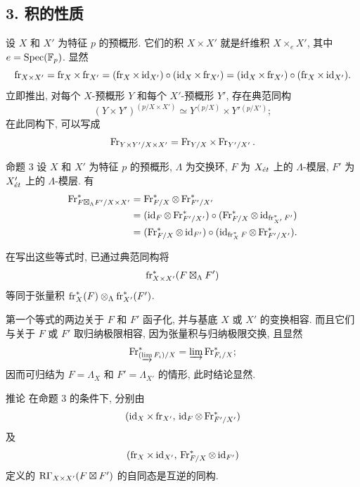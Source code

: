 \subsection*{3. 积的性质}

设 $X$ 和 $X'$ 为特征 $p$ 的预概形. 它们的积 $X\times X'$ 就是纤维积 $X\times_eX'$, 其中 $e=\operatorname{Spec}(\mathbb F_p)$. 显然
\[
\operatorname{fr}_{X\times X'}=\operatorname{fr}_X\times\operatorname{fr}_{X'}=(\operatorname{fr}_X\times\operatorname{id}_{X'})\circ(\operatorname{id}_X\times\operatorname{fr}_{X'})
=(\operatorname{id}_X\times\operatorname{fr}_{X'})\circ(\operatorname{fr}_X\times\operatorname{id}_{X'}).
\]
立即推出, 对每个 $X$-预概形 $Y$ 和每个 $X'$-预概形 $Y'$, 存在典范同构
\[
(Y\times Y')^{(p/X\times X')}
\simeq Y^{(p/X)}\times Y'{}^{(p/X')};
\]
在此同构下, 可以写成
\[
\operatorname{Fr}_{Y\times Y'/X\times X'}=\operatorname{Fr}_{Y/X}\times\operatorname{Fr}_{Y'/X'}.
\]

\begin{statement}{命题 3}
设 $X$ 和 $X'$ 为特征 $p$ 的预概形, $\Lambda$ 为交换环, $F$ 为 $X_{\acute{e}t}$ 上的 $\Lambda$-模层, $F'$ 为 $X'_{\acute{e}t}$ 上的 $\Lambda$-模层. 有
\[
\begin{aligned}
\operatorname{Fr}^*_{F\boxtimes_\Lambda F'/X\times X'}
&=\operatorname{Fr}^*_{F/X}\otimes\operatorname{Fr}^*_{F'/X'}\\
&=(\operatorname{id}_F\otimes\operatorname{Fr}^*_{F'/X'})
  \circ(\operatorname{Fr}^*_{F/X}\otimes\operatorname{id}_{\operatorname{fr}_{X'}^*F'})\\
&=(\operatorname{Fr}^*_{F/X}\otimes\operatorname{id}_{F'})
  \circ(\operatorname{id}_{\operatorname{fr}_X^*F}\otimes\operatorname{Fr}^*_{F'/X'}).
\end{aligned}
\]
\end{statement}

在写出这些等式时, 已通过典范同构将
\[
\operatorname{fr}_{X\times X'}^*(F\boxtimes_\Lambda F')
\]
等同于张量积 $\operatorname{fr}_X^*(F)\otimes_\Lambda\operatorname{fr}_{X'}^*(F')$.

第一个等式的两边关于 $F$ 和 $F'$ 函子化, 并与基底 $X$ 或 $X'$ 的变换相容. 而且它们与关于 $F$ 或 $F'$ 取归纳极限相容, 因为张量积与归纳极限交换, 且显然
\[
\operatorname{Fr}^*_{(\varinjlim F_i)/X}=\varinjlim\operatorname{Fr}^*_{F_i/X};
\]
因而可归结为 $F=\Lambda_X$ 和 $F'=\Lambda_{X'}$ 的情形, 此时结论显然.

\begin{statement}{推论}
在命题 3 的条件下, 分别由
\[
(\operatorname{id}_X\times\operatorname{fr}_{X'},\,\operatorname{id}_F\otimes\operatorname{Fr}^*_{F'/X'})
\]
及
\[
(\operatorname{fr}_X\times\operatorname{id}_{X'},\,\operatorname{Fr}^*_{F/X}\otimes\operatorname{id}_{F'})
\]
定义的 $\mathrm R\Gamma_{X\times X'}(F\boxtimes F')$ 的自同态是互逆的同构.
\end{statement}

